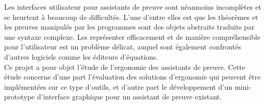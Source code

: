 Les interfaces utilisateur pour assistants de preuve sont néanmoins incomplètes et se heurtent à beaucoup de difficultés. L'une d'entre elles est que les théorèmes et les preuves manipulés par les programmes sont des objets abstraits traduits par une syntaxe complexe. Les représenter efficacement et de manière compréhensible pour l'utilisateur est un problème délicat, auquel sont également confrontés d'autres logiciels comme les éditeurs d'équations.\\

Ce projet a pour objet l'étude de l'ergonomie des assistants de preuve. Cette étude concerne d'une part l'évaluation des solutions d'ergonomie qui peuvent être implémentées sur ce type d'outils, et d'autre part le développement d'un mini-prototype d'interface graphique pour un assistant de preuve existant.